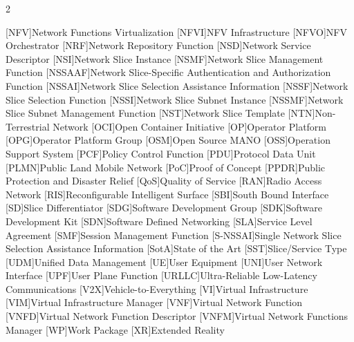 \begin{multicols}{2}
\begin{acronym}[AAAAAA]
	[NFV]{Network Functions Virtualization}
	[NFVI]{NFV Infrastructure}
	[NFVO]{NFV Orchestrator}
	[NRF]{Network Repository Function}
	[NSD]{Network Service Descriptor}
	[NSI]{Network Slice Instance}
	[NSMF]{Network Slice Management Function}
	[NSSAAF]{Network Slice-Specific Authentication and Authorization Function}
	[NSSAI]{Network Slice Selection Assistance Information}
	[NSSF]{Network Slice Selection Function}
	[NSSI]{Network Slice Subnet Instance}
	[NSSMF]{Network Slice Subnet Management Function}
	[NST]{Network Slice Template}
	[NTN]{Non-Terrestrial Network}
	[OCI]{Open Container Initiative}
	[OP]{Operator Platform}
	[OPG]{Operator Platform Group}
	[OSM]{Open Source MANO}
	[OSS]{Operation Support System}
	[PCF]{Policy Control Function}
	[PDU]{Protocol Data Unit}
	[PLMN]{Public Land Mobile Network}
	[PoC]{Proof of Concept}
	[PPDR]{Public Protection and Disaster Relief}
	[QoS]{Quality of Service}
	[RAN]{Radio Access Network}
	[RIS]{Reconfigurable Intelligent Surface}
	[SBI]{South Bound Interface}
	[SD]{Slice Differentiator}
	[SDG]{Software Development Group}
	[SDK]{Software Development Kit}
	[SDN]{Software Defined Networking}
	[SLA]{Service Level Agreement}
	[SMF]{Session Management Function}
	[S-NSSAI]{Single Network Slice Selection Assistance Information}
	[SotA]{State of the Art}
	[SST]{Slice/Service Type}
	[UDM]{Unified Data Management}
	[UE]{User Equipment}
	[UNI]{User Network Interface}
	[UPF]{User Plane Function}
	[URLLC]{Ultra-Reliable Low-Latency Communications}
	[V2X]{Vehicle-to-Everything}
	[VI]{Virtual Infrastructure}
	[VIM]{Virtual Infrastructure Manager}
	[VNF]{Virtual Network Function}
	[VNFD]{Virtual Network Function Descriptor}
	[VNFM]{Virtual Network Functions Manager}
	[WP]{Work Package}
	[XR]{Extended Reality}

\end{acronym}
\end{multicols}
